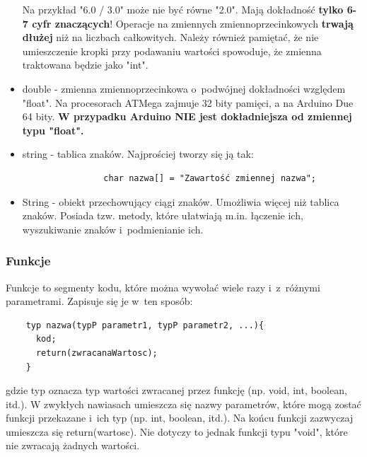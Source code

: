 \documentclass[a4paper,12pt, twoside]{article}
\begin{document}
\begin{itemize}
				Na przykład "6.0 / 3.0" może nie być równe "2.0". Mają dokładność \textbf{tylko 6-7 cyfr znaczących}! Operacje na zmiennych zmiennoprzecinkowych \textbf{trwają dłużej} niż na liczbach całkowitych.
				Należy również pamiętać, że nie umieszczenie kropki przy podawaniu wartości spowoduje, że zmienna traktowana będzie jako "int".
			\item double - zmienna zmiennoprzecinkowa o~podwójnej dokładności względem "float". Na procesorach ATMega zajmuje 32 bity pamięci, a na Arduino Due 64 bity.
				\textbf{W przypadku Arduino NIE jest dokładniejsza od zmiennej typu "float".}
			\item string - tablica znaków. Najprościej tworzy się ją tak:
				\begin{verbatim}
				char nazwa[] = "Zawartość zmiennej nazwa";
				\end{verbatim}
			\item String - obiekt przechowujący ciągi znaków. Umożliwia więcej niż tablica znaków. Posiada tzw. metody, które ułatwiają m.in. łączenie ich, wyszukiwanie znaków i~podmienianie ich.
		\end{itemize}
	
\subsubsection{Funkcje}
	Funkcje to segmenty kodu, które można wywołać wiele razy i~z~różnymi parametrami.
	Zapisuje się je w~ten sposób:
	\begin{verbatim}
	typ nazwa(typP parametr1, typP parametr2, ...){
	  kod;
	  return(zwracanaWartosc);
	}
	\end{verbatim}
	gdzie typ oznacza typ wartości zwracanej przez funkcję (np. void, int, boolean, itd.).
	W zwykłych nawiasach umieszcza się nazwy parametrów, które mogą zostać funkcji przekazane i~ich typ (np. int, boolean, itd.). Na końcu funkcji zazwyczaj umieszcza się return(wartosc). Nie dotyczy to jednak funkcji typu "void", które nie zwracają żadnych wartości.
	
\end{document}
